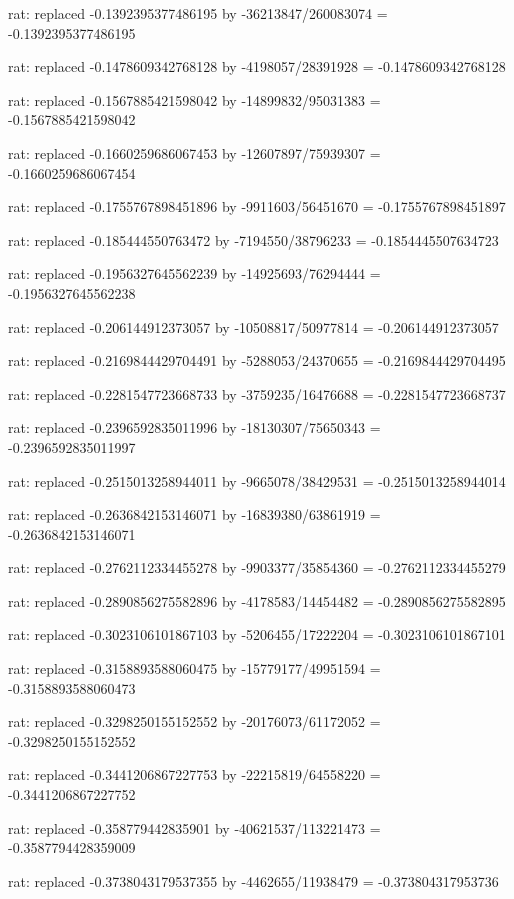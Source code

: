 \documentclass[a4paper,10pt]{article}
\begin{document}
\begin{eulernotebook}
\begin{eulercomment}
\begin{eulercomment}
\begin{eulercomment}
\begin{eulercomment}
\begin{eulercomment}
\begin{eulercomment}
\begin{eulercomment}
\begin{eulercomment}
\begin{eulercomment}
\begin{eulercomment}
\begin{eulercomment}
\begin{eulercomment}
\begin{eulercomment}
\begin{eulercomment}
\begin{eulercomment}
\begin{eulercomment}
\begin{euleroutput}
  rat: replaced -0.1392395377486195 by -36213847/260083074 = -0.1392395377486195
  
  rat: replaced -0.1478609342768128 by -4198057/28391928 = -0.1478609342768128
  
  rat: replaced -0.1567885421598042 by -14899832/95031383 = -0.1567885421598042
  
  rat: replaced -0.1660259686067453 by -12607897/75939307 = -0.1660259686067454
  
  rat: replaced -0.1755767898451896 by -9911603/56451670 = -0.1755767898451897
  
  rat: replaced -0.185444550763472 by -7194550/38796233 = -0.1854445507634723
  
  rat: replaced -0.1956327645562239 by -14925693/76294444 = -0.1956327645562238
  
  rat: replaced -0.206144912373057 by -10508817/50977814 = -0.206144912373057
  
  rat: replaced -0.2169844429704491 by -5288053/24370655 = -0.2169844429704495
  
  rat: replaced -0.2281547723668733 by -3759235/16476688 = -0.2281547723668737
  
  rat: replaced -0.2396592835011996 by -18130307/75650343 = -0.2396592835011997
  
  rat: replaced -0.2515013258944011 by -9665078/38429531 = -0.2515013258944014
  
  rat: replaced -0.2636842153146071 by -16839380/63861919 = -0.2636842153146071
  
  rat: replaced -0.2762112334455278 by -9903377/35854360 = -0.2762112334455279
  
  rat: replaced -0.2890856275582896 by -4178583/14454482 = -0.2890856275582895
  
  rat: replaced -0.3023106101867103 by -5206455/17222204 = -0.3023106101867101
  
  rat: replaced -0.3158893588060475 by -15779177/49951594 = -0.3158893588060473
  
  rat: replaced -0.3298250155152552 by -20176073/61172052 = -0.3298250155152552
  
  rat: replaced -0.3441206867227753 by -22215819/64558220 = -0.3441206867227752
  
  rat: replaced -0.358779442835901 by -40621537/113221473 = -0.3587794428359009
  
  rat: replaced -0.3738043179537355 by -4462655/11938479 = -0.373804317953736
  

\end{euleroutput}
\end{eulercomment}
\end{eulercomment}
\end{eulercomment}
\end{eulercomment}
\end{eulercomment}
\end{eulercomment}
\end{eulercomment}
\end{eulercomment}
\end{eulercomment}
\end{eulercomment}
\end{eulercomment}
\end{eulercomment}
\end{eulercomment}
\end{eulercomment}
\end{eulercomment}
\end{eulercomment}
\end{eulernotebook}
\end{document}
